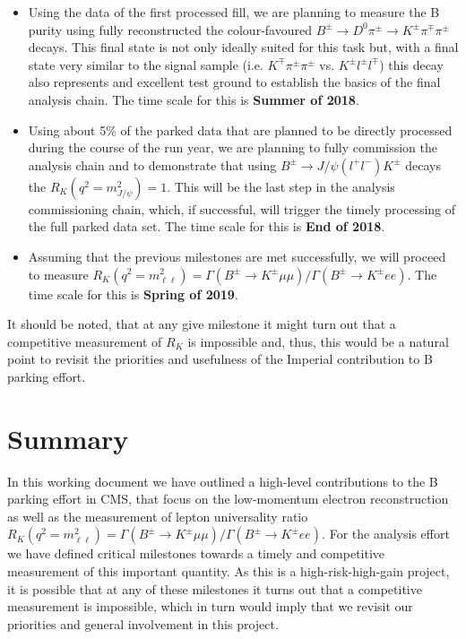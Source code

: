 \documentclass[a4paper,11pt]{article}
\begin{document}
\begin{itemize} 
\item Using the data of the first processed fill, we are planning to measure the B purity using fully reconstructed the colour-favoured $B^{\pm} \rightarrow D^0 \pi^{\pm} \rightarrow K^{\pm}  \pi^{\mp} \pi^{\pm}$ decays. This final state is not only ideally suited for this task but, with a final state very similar to the signal sample (i.e.  $K^{\mp}  \pi^{\pm} \pi^{\pm}$ vs. $K^{\pm}  l^{\pm} l^{\mp}$) this decay also represents and excellent test ground to establish the basics of the final analysis chain. The time scale for this is {\bf Summer of 2018}. 

\item  Using about 5\% of the parked data that are planned to be directly processed during the course of the run year, we are planning to fully commission the analysis chain and to demonstrate that using $B^{\pm} \rightarrow J/\psi(l^+l^-)  K^{\pm}$ decays the $R_{K} (q^2 = m_{J/\psi}^2) =1$. This will be the last step in the analysis commissioning chain, which, if successful, will trigger the timely processing of the full parked data set. The time scale for this is {\bf End of 2018}. 

\item Assuming that the previous milestones are met successfully, we will proceed to measure $R_{K} (q^2 = m_{\ell\ell}^2)= \Gamma (B^{\pm} \rightarrow K^{\pm} \mu \mu )/\Gamma (B^{\pm} \rightarrow K^{\pm}  e e)$.   The time scale for this is {\bf Spring of 2019}.

\end{itemize}

It should be noted, that at any give milestone it might turn out that a competitive measurement of $R_{K}$ is impossible and, thus, this would be a natural point to revisit the priorities and usefulness of the Imperial contribution to B parking effort.   



\section{Summary}
In this working document we have outlined a high-level contributions to the B parking effort in CMS, that focus on the low-momentum electron reconstruction as well as the measurement of lepton universality ratio $R_{K} (q^2 = m_{\ell\ell}^2)= \Gamma (B^{\pm} \rightarrow K^{\pm} \mu \mu )/\Gamma (B^{\pm} \rightarrow K^{\pm}  e e)$. For the analysis effort we have defined critical milestones towards a timely and competitive measurement of this important quantity. As this is a high-risk-high-gain project, it is possible that at any of these milestones it turns out that a competitive measurement is impossible, which in turn would imply that we revisit our priorities and general involvement in this project.   
\end{document}
